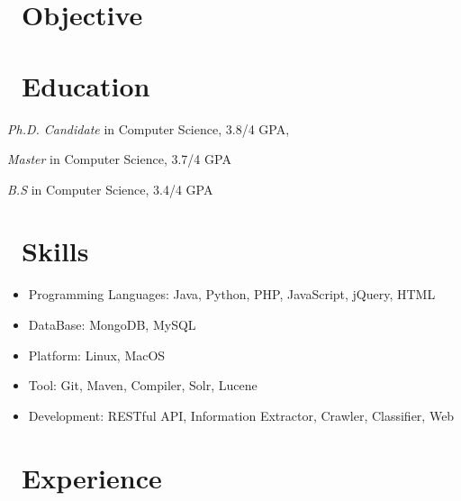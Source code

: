 \documentclass{resume}
\begin{document}





\section{\faSearch\ Objective}



\section{\faGraduationCap\ Education}

\textit{Ph.D. Candidate} in Computer Science, 3.8/4 GPA,

\textit{Master} in Computer Science, 3.7/4 GPA

\textit{B.S} in Computer Science, 3.4/4 GPA


\section{\faCogs\ Skills}
\begin{itemize}[parsep=0.5ex]
  \item Programming Languages: Java, Python, PHP, JavaScript, jQuery, HTML
  \item DataBase: MongoDB, MySQL
  \item Platform: Linux, MacOS
  \item Tool: Git, Maven, Compiler, Solr, Lucene
  \item Development: RESTful API, Information Extractor, Crawler, Classifier, Web
\end{itemize}


\section{\faUsers\ Experience}
\end{document}
